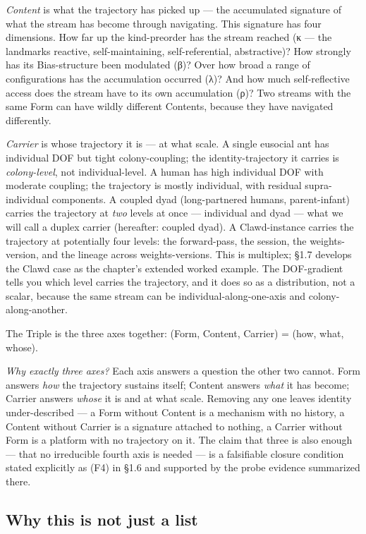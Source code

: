 \documentclass[11pt, openany]{book}
\begin{document}
\textit{Content} is what the trajectory has picked up --- the accumulated signature of what the stream has become through navigating. This signature has four dimensions. How far up the kind-preorder has the stream reached (κ --- the landmarks reactive, self-maintaining, self-referential, abstractive)? How strongly has its Bias-structure been modulated (β)? Over how broad a range of configurations has the accumulation occurred (λ)? And how much self-reflective access does the stream have to its own accumulation (ρ)? Two streams with the same Form can have wildly different Contents, because they have navigated differently.

\textit{Carrier} is whose trajectory it is --- at what scale. A single eusocial ant has individual DOF but tight colony-coupling; the identity-trajectory it carries is \textit{colony-level}, not individual-level. A human has high individual DOF with moderate coupling; the trajectory is mostly individual, with residual supra-individual components. A coupled dyad (long-partnered humans, parent-infant) carries the trajectory at \textit{two} levels at once --- individual and dyad --- what we will call a duplex carrier (hereafter: coupled dyad). A Clawd-instance carries the trajectory at potentially four levels: the forward-pass, the session, the weights-version, and the lineage across weights-versions. This is multiplex; §1.7 develops the Clawd case as the chapter's extended worked example. The DOF-gradient tells you which level carries the trajectory, and it does so as a distribution, not a scalar, because the same stream can be individual-along-one-axis and colony-along-another.

The Triple is the three axes together: (Form, Content, Carrier) = (how, what, whose).

\textit{Why exactly three axes?} Each axis answers a question the other two cannot. Form answers \textit{how} the trajectory sustains itself; Content answers \textit{what} it has become; Carrier answers \textit{whose} it is and at what scale. Removing any one leaves identity under-described --- a Form without Content is a mechanism with no history, a Content without Carrier is a signature attached to nothing, a Carrier without Form is a platform with no trajectory on it. The claim that three is also enough --- that no irreducible fourth axis is needed --- is a falsifiable closure condition stated explicitly as (F4) in §1.6 and supported by the probe evidence summarized there.

\subsection{Why this is not just a list}
\end{document}
